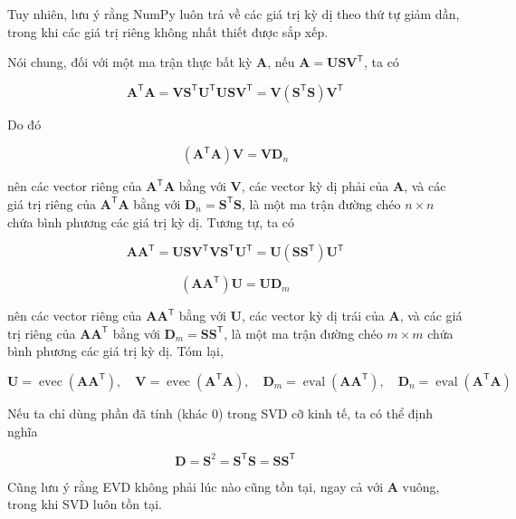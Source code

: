 Tuy nhiên, lưu ý rằng NumPy luôn trả về các giá trị kỳ dị theo thứ tự giảm dần, trong khi các giá trị riêng không nhất thiết được sắp xếp.

Nói chung, đối với một ma trận thực bất kỳ $\mathbf{A}$, nếu $\mathbf{A} = \mathbf{U}\mathbf{S}\mathbf{V}^{\mathsf{T}}$, ta có

\begin{equation}
\mathbf{A}^{\mathsf{T}}\mathbf{A} = \mathbf{V}\mathbf{S}^{\mathsf{T}}\mathbf{U}^{\mathsf{T}}\mathbf{U}\mathbf{S}\mathbf{V}^{\mathsf{T}} = \mathbf{V}(\mathbf{S}^{\mathsf{T}}\mathbf{S})\mathbf{V}^{\mathsf{T}}
\tag{7.180}
\end{equation}

Do đó

\begin{equation}
(\mathbf{A}^{\mathsf{T}}\mathbf{A})\mathbf{V} = \mathbf{V}\mathbf{D}_n
\tag{7.181}
\end{equation}

nên các vector riêng của $\mathbf{A}^{\mathsf{T}}\mathbf{A}$ bằng với $\mathbf{V}$, các vector kỳ dị phải của $\mathbf{A}$, và các giá trị riêng của $\mathbf{A}^{\mathsf{T}}\mathbf{A}$ bằng với $\mathbf{D}_n = \mathbf{S}^{\mathsf{T}}\mathbf{S}$, là một ma trận đường chéo $n \times n$ chứa bình phương các giá trị kỳ dị. Tương tự, ta có

\begin{equation}
\mathbf{A}\mathbf{A}^{\mathsf{T}} = \mathbf{U}\mathbf{S}\mathbf{V}^{\mathsf{T}}\mathbf{V}\mathbf{S}^{\mathsf{T}}\mathbf{U}^{\mathsf{T}} = \mathbf{U}(\mathbf{S}\mathbf{S}^{\mathsf{T}})\mathbf{U}^{\mathsf{T}}
\tag{7.182}
\end{equation}

\begin{equation}
(\mathbf{A}\mathbf{A}^{\mathsf{T}})\mathbf{U} = \mathbf{U}\mathbf{D}_m
\tag{7.183}
\end{equation}

nên các vector riêng của $\mathbf{A}\mathbf{A}^{\mathsf{T}}$ bằng với $\mathbf{U}$, các vector kỳ dị trái của $\mathbf{A}$, và các giá trị riêng của $\mathbf{A}\mathbf{A}^{\mathsf{T}}$ bằng với $\mathbf{D}_m = \mathbf{S}\mathbf{S}^{\mathsf{T}}$, là một ma trận đường chéo $m \times m$ chứa bình phương các giá trị kỳ dị. Tóm lại,

\begin{equation}
\mathbf{U} = \operatorname{evec}(\mathbf{A}\mathbf{A}^{\mathsf{T}}), \quad \mathbf{V} = \operatorname{evec}(\mathbf{A}^{\mathsf{T}}\mathbf{A}), \quad \mathbf{D}_m = \operatorname{eval}(\mathbf{A}\mathbf{A}^{\mathsf{T}}), \quad \mathbf{D}_n = \operatorname{eval}(\mathbf{A}^{\mathsf{T}}\mathbf{A})
\tag{7.184}
\end{equation}

Nếu ta chỉ dùng phần đã tính (khác 0) trong SVD cỡ kinh tế, ta có thể định nghĩa

\begin{equation}
\mathbf{D} = \mathbf{S}^2 = \mathbf{S}^{\mathsf{T}}\mathbf{S} = \mathbf{S}\mathbf{S}^{\mathsf{T}}
\tag{7.185}
\end{equation}

Cũng lưu ý rằng EVD không phải lúc nào cũng tồn tại, ngay cả với $\mathbf{A}$ vuông, trong khi SVD luôn tồn tại.
